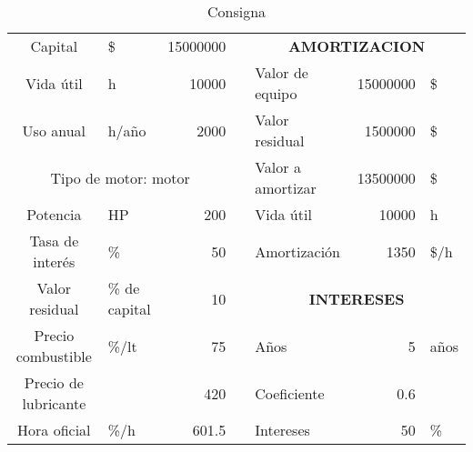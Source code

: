 \documentclass[../main.tex]{subfiles}
\begin{document}
\begin{table}[htbp]
  \centering
  \caption{Consigna}
    \begin{tabular}{rrrr|ccc|l|}
\cline{1-3}\cline{5-8}    \multicolumn{1}{|c|}{Capital} & \multicolumn{1}{l|}{\$} & \multicolumn{1}{r|}{15000000} &       & \multicolumn{4}{c|}{\textbf{AMORTIZACION}} \bigstrut\\
\cline{1-3}\cline{5-8}    \multicolumn{1}{|c|}{Vida útil} & \multicolumn{1}{l|}{h} & \multicolumn{1}{r|}{10000} &       & \multicolumn{1}{l|}{Valor de equipo} & \multicolumn{1}{l|}{} & \multicolumn{1}{r|}{15000000} & \$ \bigstrut\\
\cline{1-3}\cline{5-8}    \multicolumn{1}{|c|}{Uso anual} & \multicolumn{1}{l|}{h/año} & \multicolumn{1}{r|}{2000} &       & \multicolumn{1}{l|}{Valor residual} & \multicolumn{1}{l|}{} & \multicolumn{1}{r|}{1500000} & \$ \bigstrut\\
\cline{1-3}\cline{5-8}    \multicolumn{3}{|c|}{Tipo de motor: motor} &       & \multicolumn{1}{l|}{Valor a amortizar} & \multicolumn{1}{l|}{} & \multicolumn{1}{r|}{13500000} & \$ \bigstrut\\
\cline{1-3}\cline{5-8}    \multicolumn{1}{|c|}{Potencia} & \multicolumn{1}{l|}{HP} & \multicolumn{1}{r|}{200} &       & \multicolumn{2}{l|}{Vida útil} & \multicolumn{1}{r|}{10000} & h \bigstrut\\
\cline{1-3}\cline{5-8}    \multicolumn{1}{|c|}{Tasa de interés} & \multicolumn{1}{l|}{\%} & \multicolumn{1}{r|}{50} &       & \multicolumn{2}{l|}{Amortización} & \multicolumn{1}{r|}{1350} & \$/h \bigstrut\\
\cline{1-3}\cline{5-8}    \multicolumn{1}{|c|}{Valor residual} & \multicolumn{1}{l|}{\% de capital} & \multicolumn{1}{r|}{10} &       & \multicolumn{4}{c|}{\textbf{INTERESES}} \bigstrut\\
\cline{1-3}\cline{5-8}    \multicolumn{1}{|c|}{Precio combustible} & \multicolumn{1}{l|}{\%/lt} & \multicolumn{1}{r|}{75} &       & \multicolumn{2}{l|}{Años} & \multicolumn{1}{r|}{5} & años \bigstrut\\
\cline{1-3}\cline{5-8}    \multicolumn{1}{|c|}{Precio de lubricante} & \multicolumn{1}{r|}{} & \multicolumn{1}{r|}{420} &       & \multicolumn{2}{l|}{Coeficiente } & \multicolumn{1}{r|}{0.6} &  \bigstrut\\
\cline{1-3}\cline{5-8}    \multicolumn{1}{|c|}{Hora oficial} & \multicolumn{1}{l|}{\%/h} & \multicolumn{1}{r|}{601.5} &       & \multicolumn{2}{l|}{Intereses} & \multicolumn{1}{r|}{50} & \% \bigstrut\\

\end{tabular}
\end{table}
\end{document}
